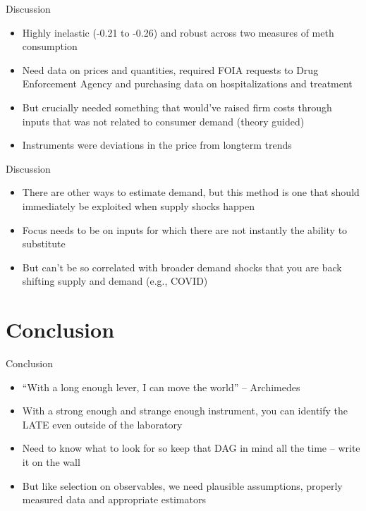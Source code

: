 \documentclass{beamer}
\begin{document}
\begin{frame}{Discussion}

\begin{itemize}
\item Highly inelastic (-0.21 to -0.26) and robust across two measures of meth consumption
\item Need data on prices and quantities, required FOIA requests to Drug Enforcement Agency and purchasing data on hospitalizations and treatment
\item But crucially needed something that would've raised firm costs through inputs that was not related to consumer demand (theory guided)
\item Instruments were deviations in the price from longterm trends
\end{itemize}

\end{frame}

\begin{frame}{Discussion}

\begin{itemize}
\item There are other ways to estimate demand, but this method is one that should immediately be exploited when supply shocks happen
\item Focus needs to be on inputs for which there are not instantly the ability to substitute
\item But can't be so correlated with broader demand shocks that you are back shifting supply and demand (e.g., COVID)
\end{itemize}

\end{frame}

\section{Conclusion}

\begin{frame}{Conclusion}

\begin{itemize}
\item ``With a long enough lever, I can move the world'' -- Archimedes
\item With a strong enough and strange enough instrument, you can identify the LATE even outside of the laboratory
\item Need to know what to look for so keep that DAG in mind all the time -- write it on the wall
\item But like selection on observables, we need plausible assumptions, properly measured data and appropriate estimators
\end{itemize}

\end{frame}
\end{document}
